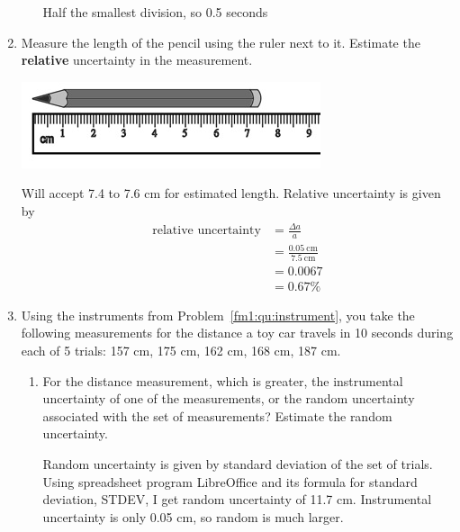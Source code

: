 \documentclass{article}
\begin{document}
\begin{enumerate}
\begin{enumerate}
		\begin{solution}
			Half the smallest division, so 0.5 seconds
		\end{solution}
	\end{enumerate}
	
	\item Measure the length of the pencil using the ruler next to it. Estimate the \textbf{relative} uncertainty in the measurement.
	
	\includegraphics[width=\textwidth]{pencil-ruler.jpg}
	
	\begin{solution}
		Will accept 7.4 to 7.6 cm for estimated length. Relative uncertainty is given by
		\begin{align*}
		\textrm{relative uncertainty} &= \frac{\Delta a}{a} \\
		 &= \frac{0.05\:\mathrm{cm}}{7.5\:\mathrm{cm}} \\
		 &= 0.0067 \\
		 &= 0.67\%
		\end{align*}
	\end{solution}
	
	\item Using the instruments from Problem~\ref{fm1:qu:instrument}, you take the following measurements for the distance a toy car travels in 10 seconds during each of 5 trials: 157 cm, 175 cm, 162 cm, 168 cm, 187 cm.
	\begin{enumerate}
		\item For the distance measurement, which is greater, the instrumental uncertainty of one of the measurements, or the random uncertainty associated with the set of measurements? Estimate the random uncertainty.
		
		\begin{solution}
			Random uncertainty is given by standard deviation of the set of trials. Using spreadsheet program LibreOffice and its formula for standard deviation, STDEV, I get random uncertainty of 11.7 cm. Instrumental uncertainty is only 0.05 cm, so random is much larger.
		\end{solution}
		

\end{enumerate}
\end{enumerate}
\end{document}
